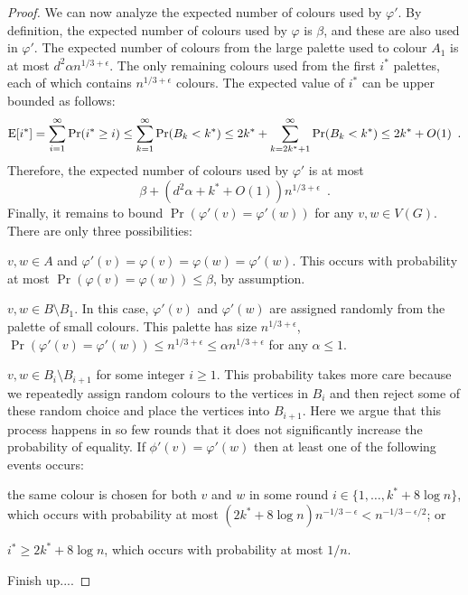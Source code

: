 \documentclass[kpfonts]{patmorin}
\begin{document}
\begin{proof}
  We can now analyze the expected number of colours used by $\varphi'$.  By definition, the expected number of colours used by $\varphi$ is $\beta$, and these are also used in $\varphi'$.  The expected number of colours from the large palette used to colour $A_1$ is at most $d^2\alpha n^{1/3+\epsilon}$.  The only remaining colours used from the first $i^*$ palettes, each of which contains $n^{1/3+\epsilon}$ colours.  The expected value of $i^*$ can be upper bounded as follows:
  \[
    \mathrm{E}[i^*] = \sum_{i=1}^\infty \Pr(i^*\ge i)
    \le \sum_{k=1}^{\infty} \Pr(B_k < k^*)
    \le 2k^* + \sum_{k=2k^*+1}^{\infty} \Pr(B_k < k^*)
    \le 2k^* + O(1) \enspace .
  \]
  Therefore, the expected number of colours used by $\varphi'$ is at most
  \[
     \beta + (d^2\alpha + k^*+O(1))n^{1/3+\epsilon} \enspace .
  \]
  Finally, it remains to bound $\Pr(\varphi'(v)=\varphi'(w))$ for any $v,w\in V(G)$.  There are only three possibilities:
  \begin{compactenum}
    \item $v,w\in A$ and $\varphi'(v)=\varphi(v)=\varphi(w)=\varphi'(w)$.  This occurs with probability at most $\Pr(\varphi(v)=\varphi(w))\le \beta$, by assumption.

    \item $v,w\in B\setminus B_1$.  In this case, $\varphi'(v)$ and $\varphi'(w)$ are assigned randomly from the palette of small colours.  This palette has size $n^{1/3+\epsilon}$, $\Pr(\varphi'(v)=\varphi'(w))\le n^{1/3+\epsilon} \le \alpha n^{1/3+\epsilon}$ for any $\alpha \le 1$.

    \item $v,w\in B_i\setminus B_{i+1}$ for some integer $i\ge 1$.  This probability takes more care because we repeatedly assign random colours to the vertices in $B_i$ and then reject some of these random choice and place the vertices into $B_{i+1}$.  Here we argue that this process happens in so few rounds that it does not significantly increase the probability of equality.  If $\phi'(v)=\varphi'(w)$ then at least one of the following events occurs:
    \begin{compactenum}
      \item the same colour is chosen for both $v$ and $w$ in some round $i\in\{1,\ldots,k^*+8\log n\}$, which occurs with probability at most $(2k^*+8\log n)n^{-1/3-\epsilon}<n^{-1/3-\epsilon/2}$; or

      \item $i^*\ge 2k^*+8\log n$, which occurs with probability at most $1/n$.
    \end{compactenum}
  \end{compactenum}
  Finish up....
\end{proof}
\end{document}
